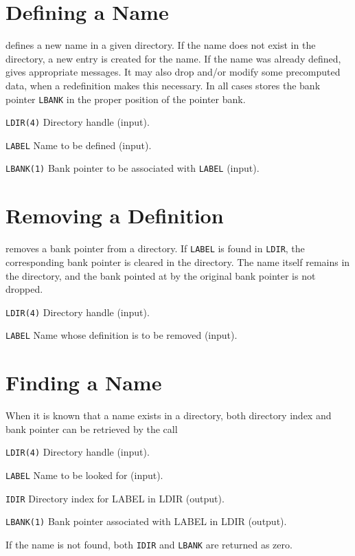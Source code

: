 \section{Defining a Name}
\label{DIDEFI}
defines a new name in a given directory.
If the name does not exist in the directory,
a new entry is created for the name.
If the name was already defined,  gives appropriate
messages.
It may also drop and/or modify some precomputed data,
when a redefinition makes this necessary.
In all cases  stores the bank pointer {\tt LBANK} in the
proper position of the pointer bank.
\begin{mylist}
\item[\tt LDIR(4)]
Directory handle (input).
\item[\tt LABEL]
Name to be defined (input).
\item[\tt LBANK(1)]
Bank pointer to be associated with {\tt LABEL} (input).
\end{mylist}
 
\section{Removing a Definition}
\label{DIDROP}
removes a bank pointer from a directory.
If {\tt LABEL} is found in {\tt LDIR},
the corresponding bank pointer is cleared in the directory.
The name itself remains in the directory,
and the bank pointed at by the original bank pointer is not dropped.
\begin{mylist}
\item[\tt LDIR(4)]
Directory handle (input).
\item[\tt LABEL]
Name whose definition is to be removed (input).
\end{mylist}
\clearpage
 
\section{Finding a Name}
\label{DIFIND}
When it is known that a name exists in a directory,
both directory index and bank pointer can be retrieved by the call
\begin{mylist}
\item[\tt LDIR(4)]
Directory handle (input).
\item[\tt LABEL]
Name to be looked for (input).
\item[\tt IDIR]
Directory index for LABEL in LDIR (output).
\item[\tt LBANK(1)]
Bank pointer associated with LABEL in LDIR (output).
\end{mylist}
If the name is not found, both {\tt IDIR} and {\tt LBANK} are returned
as zero.
 
